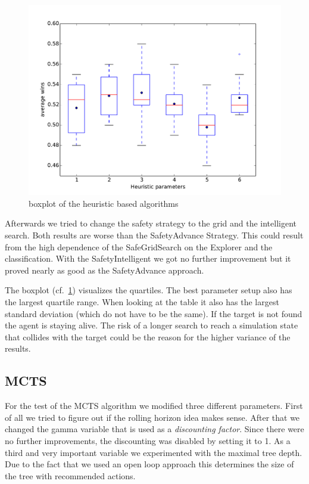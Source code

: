\begin{figure}
\centering
\includegraphics[scale=0.5]{images/eval_heur.pdf}
\caption{boxplot of the heuristic based algorithms}
\label{fig:eval_heur}
\end{figure}

Afterwards we tried to change the safety strategy to the grid and the intelligent search. Both results
are worse than the SafetyAdvance Strategy. This could result from the high dependence of the SafeGridSearch on the Explorer and the classification.
With the SafetyIntelligent we got no further improvement but it proved nearly as good as the SafetyAdvance approach.

The boxplot (cf.~\cref{fig:eval_heur}) visualizes the quartiles. The best parameter setup also has the largest
quartile range. When looking at the table it also has the largest standard deviation (which do not have to be the same).
If the target is not found the agent is staying alive. The risk of a longer search to reach a simulation state
that collides with the target could be the reason for the higher variance of the results.



\subsection{MCTS} 

For the test of the \ac{MCTS} algorithm we modified three different parameters. First of all we tried to figure out
if the rolling horizon idea makes sense. After that we changed the gamma variable that is used
as a \textit{discounting factor}. Since there were no further improvements, the discounting was disabled by setting it to 1.
As a third and very important variable we experimented with the maximal tree depth. Due to the fact that we used an open loop approach this determines 
the size of the tree with recommended actions.


